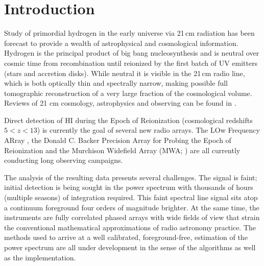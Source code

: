 \documentclass[twolcolumn,iop]{emulateapj}
\begin{document}





\section{Introduction} 
  Study of primordial hydrogen  in the early universe via 21\,cm radiation has been forecast to provide a wealth of astrophysical and cosmological information.   Hydrogen is the principal product of big bang nucleosynthesis and is neutral over cosmic time from recombination until reionized by the first batch of UV emitters (stars and accretion disks). While neutral it is visible in the 21\,cm radio line, which is both optically thin and spectrally narrow, making possible full tomographic reconstruction of a very large fraction of the cosmological volume.  Reviews of 21 cm cosmology, astrophysics and observing can be found in \cite{Morales:2010p8093,Furlanetto:2006p2267,Pritchard:2012p9555,zaroubi2013epoch}.
  
Direct detection of HI during the Epoch of Reionization (cosmological redshifts $5<z<13$) is currently the goal of several new radio arrays. The LOw Frequency ARray \citep[LOFAR;][]{Yatawatta:2013p9699}, the Donald C. Backer Precision Array for Probing the Epoch of Reionization \citep[PAPER][]{Parsons:2014p10499} and the Murchison Widefield Array (MWA; \cite{Tingay:2013p9022,Bowman:2013p9950}) are all currently conducting long observing campaigns.



The analysis of the resulting data presents several challenges. The signal is faint; initial detection is being sought in the power spectrum with thousands of hours (multiple seasons) of integration required. This faint spectral line signal sits atop a continuum foreground four orders of magnitude brighter. At the same time, the instruments are fully correlated phased arrays with wide fields of view that strain the conventional mathematical approximations of radio astronomy practice. The methods used to arrive at a well calibrated, foreground-free, estimation of the power spectrum are all under development in the sense of the algorithms as well as the implementation.  
\end{document}
